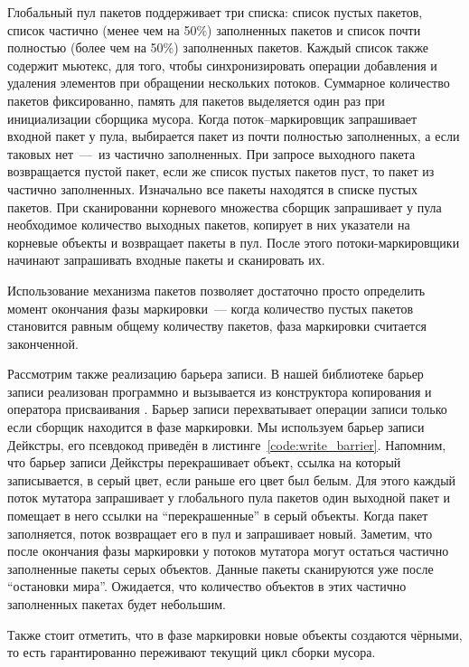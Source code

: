 Глобальный пул пакетов поддерживает три списка: список пустых пакетов, 
список частично (менее чем на 50\%) заполненных пакетов и список почти 
полностью (более чем на 50\%) заполненных пакетов. 
Каждый список также содержит мьютекс, для того, чтобы синхронизировать операции добавления 
и удаления элементов при обращении нескольких потоков. 
Суммарное количество пакетов фиксированно, память для пакетов выделяется один раз 
при инициализации сборщика мусора. 
Когда поток--маркировщик запрашивает входной пакет у пула, выбирается пакет из почти 
полностью заполненных, а если таковых нет~---~из частично заполненных. 
При запросе выходного пакета возвращается пустой пакет, если же список пустых пакетов пуст, 
то пакет из частично заполненных. 
Изначально все пакеты находятся в списке пустых пакетов. 
При сканированни корневого множества сборщик запрашивает у пула необходимое количество 
выходных пакетов, копирует в них указатели на корневые объекты и возвращает пакеты в пул. 
После этого потоки-маркировщики начинают запрашивать входные пакеты и сканировать их. 

Использование механизма пакетов позволяет достаточно просто определить момент окончания 
фазы маркировки~--- когда количество пустых пакетов становится равным общему количеству 
пакетов, фаза маркировки считается законченной. 

Рассмотрим также реализацию барьера записи. 
В нашей библиотеке барьер записи реализован программно и вызывается из конструктора 
копирования и оператора присваивания . 
Барьер записи перехватывает операции записи только если сборщик находится в фазе маркировки. 
Мы используем барьер записи Дейкстры, его псевдокод приведён в листинге~\ref{code:write_barrier}. 
Напомним, что барьер записи Дейкстры перекрашивает объект, ссылка на который записывается, 
в серый цвет, если раньше его цвет был белым. 
Для этого каждый поток мутатора запрашивает у глобального пула пакетов один выходной пакет 
и помещает в него ссылки на ``перекрашенные'' в серый объекты. 
Когда пакет заполняется, поток возвращает его в пул и запрашивает новый. 
Заметим, что после окончания фазы маркировки у потоков мутатора могут остаться частично 
заполненные пакеты серых объектов. 
Данные пакеты сканируются уже после ``остановки мира''. 
Ожидается, что количество объектов в этих частично заполненных пакетах будет небольшим.

Также стоит отметить, что в фазе маркировки новые объекты создаются чёрными, 
то есть гарантированно переживают текущий цикл сборки мусора.

